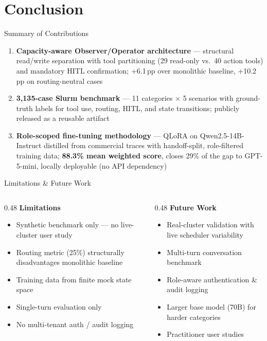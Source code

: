 \section{Conclusion}

\begin{frame}{Summary of Contributions}
  \begin{enumerate}
    \item \textbf{Capacity-aware Observer/Operator architecture} --- structural read/write separation with tool partitioning (29 read-only vs.\ 40 action tools) and mandatory HITL confirmation; +6.1\,pp over monolithic baseline, +10.2\,pp on routing-neutral cases
    \item \textbf{3,135-case Slurm benchmark} --- 11 categories $\times$ 5 scenarios with ground-truth labels for tool use, routing, HITL, and state transitions; publicly released as a reusable artifact
    \item \textbf{Role-scoped fine-tuning methodology} --- QLoRA on Qwen2.5-14B-Instruct distilled from commercial traces with handoff-split, role-filtered training data; \textbf{88.3\% mean weighted score}, closes 29\% of the gap to GPT-5-mini, locally deployable (no API dependency)
  \end{enumerate}
\end{frame}

\begin{frame}{Limitations \& Future Work}
  \begin{columns}[T]
    \begin{column}{0.48\textwidth}
      \textbf{Limitations}
      \begin{itemize}
        \item Synthetic benchmark only — no live-cluster user study
        \item Routing metric (25\%) structurally disadvantages monolithic baseline
        \item Training data from finite mock state space
        \item Single-turn evaluation only
        \item No multi-tenant auth / audit logging
      \end{itemize}
    \end{column}
    \begin{column}{0.48\textwidth}
      \textbf{Future Work}
      \begin{itemize}
        \item Real-cluster validation with live scheduler variability
        \item Multi-turn conversation benchmark
        \item Role-aware authentication \& audit logging
        \item Larger base model (70B) for harder categories
        \item Practitioner user studies
      \end{itemize}
    \end{column}
  \end{columns}
\end{frame}
